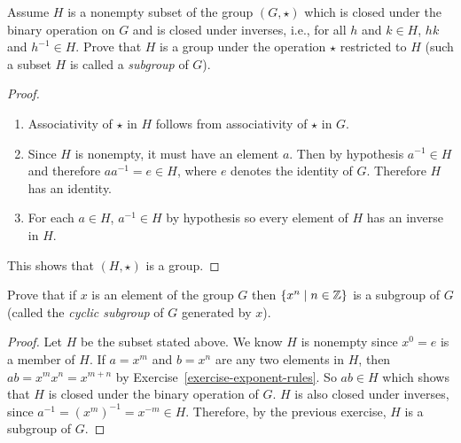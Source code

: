  Assume $H$ is a nonempty subset of the group $(G,\star)$
which is closed under the binary operation on $G$ and is closed under
inverses, i.e., for all $h$ and $k\in H$, $hk$ and $h^{-1}\in
H$. Prove that $H$ is a group under the operation $\star$ restricted
to $H$ (such a subset $H$ is called a {\em subgroup} of $G$).
\label{exercise-subgroup-conditions}
\begin{proof}
  \begin{enumerate}
  \item Associativity of $\star$ in $H$ follows from associativity of
    $\star$ in $G$.

  \item Since $H$ is nonempty, it must have an element $a$. Then by
    hypothesis $a^{-1}\in H$ and therefore $aa^{-1} = e \in H$, where
    $e$ denotes the identity of $G$. Therefore $H$ has an identity.

  \item For each $a\in H$, $a^{-1}\in H$ by hypothesis so every
    element of $H$ has an inverse in $H$.
  \end{enumerate}

  This shows that $(H,\star)$ is a group.
\end{proof}

 Prove that if $x$ is an element of the group $G$ then
$\{x^n \mid n\in\mathbb{Z}\}$ is a subgroup of $G$ (called the {\em cyclic
  subgroup} of $G$ generated by $x$).
\begin{proof}
  Let $H$ be the subset stated above. We know $H$ is nonempty since
  $x^0 = e$ is a member of $H$. If $a = x^m$ and $b = x^n$ are any two
  elements in $H$, then $ab = x^mx^n = x^{m+n}$ by
  Exercise~\ref{exercise-exponent-rules}. So $ab\in H$ which shows
  that $H$ is closed under the binary operation of $G$. $H$ is also
  closed under inverses, since $a^{-1} = (x^m)^{-1} = x^{-m}\in
  H$. Therefore, by the previous exercise, $H$ is a subgroup of $G$.
\end{proof}

